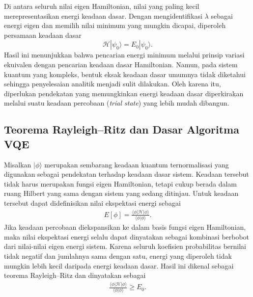 Di antara seluruh nilai eigen Hamiltonian, nilai yang paling kecil merepresentasikan energi keadaan dasar. Dengan mengidentifikasi $\lambda$ sebagai energi eigen dan memilih nilai minimum yang mungkin dicapai, diperoleh persamaan keadaan dasar
\begin{equation}
    \label{eq:keadaan_dasar}
    \mathcal{H}|\psi_0\rangle = E_0|\psi_0\rangle.
\end{equation}
Hasil ini menunjukkan bahwa pencarian energi minimum melalui prinsip variasi ekuivalen dengan pencarian keadaan dasar Hamiltonian. Namun, pada sistem kuantum yang kompleks, bentuk eksak keadaan dasar umumnya tidak diketahui sehingga penyelesaian analitik menjadi sulit dilakukan. Oleh karena itu, diperlukan pendekatan yang memungkinkan energi keadaan dasar diperkirakan melalui suatu keadaan percobaan (\textit{trial state}) yang lebih mudah dibangun.

\subsection{Teorema Rayleigh--Ritz dan Dasar Algoritma VQE}
Misalkan $|\phi\rangle$ merupakan sembarang keadaan kuantum ternormalisasi yang digunakan sebagai pendekatan terhadap keadaan dasar sistem. Keadaan tersebut tidak harus merupakan fungsi eigen Hamiltonian, tetapi cukup berada dalam ruang Hilbert yang sama dengan sistem yang sedang ditinjau. Untuk keadaan tersebut dapat didefinisikan nilai ekspektasi energi sebagai
\begin{equation}
    \begin{split}
    E[\phi] = \frac{\langle \phi | \mathcal{H} | \phi \rangle}{\langle \phi | \phi \rangle}.
    \end{split}
\end{equation}
Jika keadaan percobaan diekspansikan ke dalam basis fungsi eigen Hamiltonian, maka nilai ekspektasi energi selalu dapat dinyatakan sebagai kombinasi berbobot dari nilai-nilai eigen energi sistem. Karena seluruh koefisien probabilitas bernilai tidak negatif dan jumlahnya sama dengan satu, energi yang diperoleh tidak mungkin lebih kecil daripada energi keadaan dasar. Hasil ini dikenal sebagai teorema Rayleigh–Ritz dan dinyatakan sebagai
\begin{equation}
    \label{eq:teorema_rayleigh_ritz}
    \begin{split}
    \frac{\langle \phi | \mathcal{H} | \phi \rangle}{\langle \phi | \phi \rangle} \geq E_0.
    \end{split}
\end{equation}

